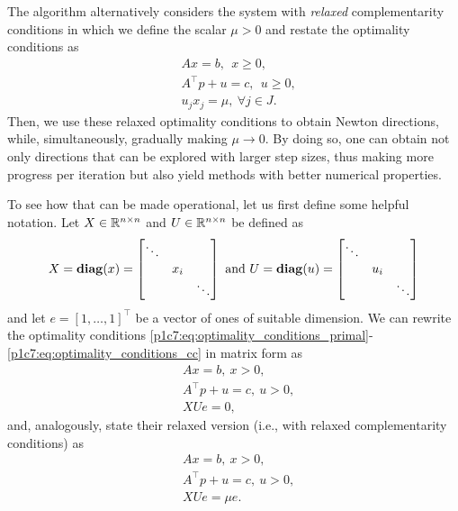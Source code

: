 The algorithm alternatively considers the system with \emph{relaxed} complementarity conditions in which we define the scalar $\mu > 0$ and restate the optimality conditions as 	
	\begin{align*}
		& Ax = b, \ \ x \geq 0,\\ 
		& A^\top p + u = c, \ \ u \geq 0, \\
		& u_j x_j = \mu, \ \forall j \in J. 
	\end{align*}
	Then, we use these relaxed optimality conditions to obtain Newton directions, while, simultaneously, gradually making $\mu \to 0$. By doing so, one can obtain not only directions that can be explored with larger step sizes, thus making more progress per iteration but also yield methods with better numerical properties.
	
To see how that can be made operational, let us first define some helpful notation. Let $X\in \mathbb{R}^{n\times n}$ and $U \in \mathbb{R}^{n \times n}$ be defined as
	$$
	X = \mathop{\bf diag}(x) = \begin{bmatrix} \ddots & & \\   
	                                        & x_i & \\
	                                        & & \ddots     
	                 \end{bmatrix}
	                 \text{ and }
	U = \mathop{\bf diag}(u) = \begin{bmatrix} \ddots & & \\   
	                                        & u_i & \\
	                                        & & \ddots     
	                 \end{bmatrix}               
	$$
	and let $e = [1,\dots,1]^\top$ be a vector of ones of suitable dimension. We can rewrite the optimality conditions \eqref{p1c7:eq:optimality_conditions_primal}-\eqref{p1c7:eq:optimality_conditions_cc} in matrix form as 
	\begin{align*}
		&Ax = b, \ x > 0, \\ 
		&A^\top p + u = c, \ u > 0,\\ 
		&XUe = 0, 
	\end{align*}
 	and, analogously, state their relaxed version (i.e., with relaxed complementarity conditions) as
 	\begin{align}
		&Ax = b, \ x > 0, \label{p1c7:eq:optimality_conditions_matrix_primal}\\ 
		&A^\top p + u = c, \ u > 0, \label{p1c7:eq:optimality_conditions_matrix_dual}\\ 
		&XUe = \mu e. \label{p1c7:eq:optimality_conditions_matrix_relaxed_cc}
	\end{align}


